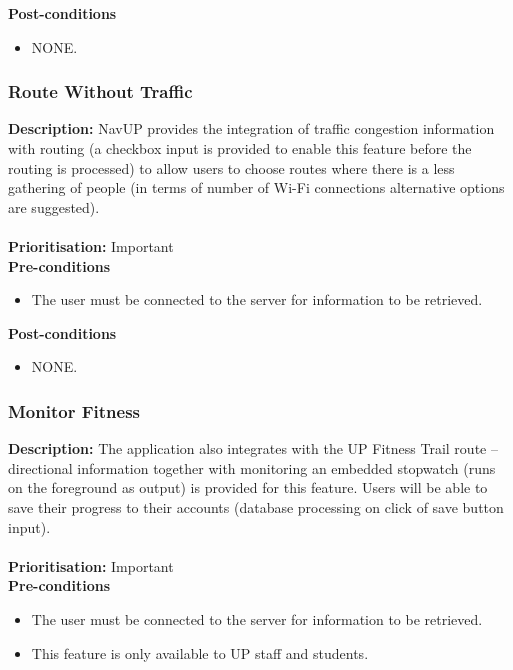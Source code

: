 \documentclass[runningheads,a4paper]{article}
\begin{document}
\textbf{Post-conditions}
\begin{itemize}
  	\item NONE.
\end{itemize}

\subsubsection{Route Without Traffic}

\textbf{Description:}  NavUP provides the integration of traffic congestion information with routing (a checkbox input is provided to enable this feature before the routing is processed) to allow users to choose routes where there is a less gathering of people (in terms of number of Wi-Fi connections alternative options are suggested).\\\\
\noindent
\textbf{Prioritisation:} Important\\
  
  
\textbf{Pre-conditions}
\begin{itemize}
	\item The user must be connected to the server for information to be retrieved.
\end{itemize}
  
\textbf{Post-conditions}
\begin{itemize}
  	\item NONE.
\end{itemize}

\subsubsection{Monitor Fitness}

\textbf{Description:} The application also integrates with the UP Fitness Trail route – directional information together with monitoring an embedded stopwatch (runs on the foreground as output) is provided for this feature. Users will be able to save their progress to their accounts (database processing on click of save button input).\\\\
\noindent
\textbf{Prioritisation:} Important\\
  
  
\textbf{Pre-conditions}
\begin{itemize}
	\item The user must be connected to the server for information to be retrieved.
	\item This feature is only available to UP staff and students.
\end{itemize}
  
\end{document}
